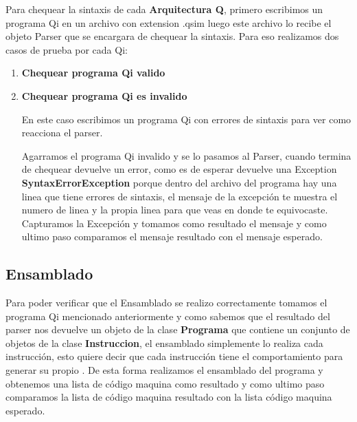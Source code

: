 Para chequear la sintaxis de cada \textbf{Arquitectura Q}, primero escribimos un programa Qi en un archivo con extension .qsim luego este archivo lo recibe el objeto Parser que se encargara de chequear la sintaxis. 
Para eso realizamos dos casos de prueba por cada Qi:
\begin{enumerate}
\item \textbf{Chequear programa Qi valido}



\item \textbf{Chequear programa Qi es invalido} 

En este caso escribimos un programa Qi con errores de sintaxis para ver como reacciona el parser.

Agarramos el programa Qi invalido y se lo pasamos al Parser, cuando termina de chequear devuelve un error, como es de esperar devuelve una Exception \textbf{SyntaxErrorException} porque dentro del archivo del programa hay una linea que tiene errores de sintaxis, el mensaje de la excepción te muestra el numero de linea y la propia linea para que veas en donde te equivocaste. Capturamos la Excepción y tomamos como resultado el mensaje y como ultimo paso comparamos el mensaje resultado con el mensaje esperado.
\end{enumerate}

\subsection{Ensamblado}
Para poder verificar que el Ensamblado se realizo correctamente tomamos el programa Qi mencionado anteriormente y como sabemos que el resultado del parser nos devuelve un objeto de la clase \textbf{Programa} que contiene un conjunto de objetos de la clase \textbf{Instruccion}, el ensamblado simplemente lo realiza cada instrucción, esto quiere decir que cada instrucción tiene el comportamiento para generar su propio \codmaq. De esta forma realizamos el ensamblado del programa y obtenemos una lista de código maquina como resultado y como ultimo paso comparamos la lista de código maquina resultado con la lista código maquina esperado.

